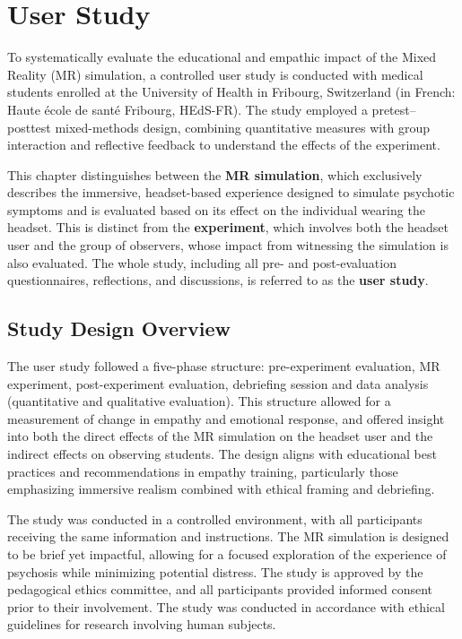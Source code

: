 \chapter{User Study}
\label{ch:userstudy}


To systematically evaluate the educational and empathic impact of the Mixed Reality (MR) simulation, a controlled user study is conducted with medical students enrolled at the University of Health in Fribourg, Switzerland (in French: Haute école de santé Fribourg, HEdS-FR). The study employed a pretest–posttest mixed-methods design, combining quantitative measures with group interaction and reflective feedback to understand the effects of the experiment.

\vspace{1em}

This chapter distinguishes between the \textbf{MR simulation}, which exclusively describes the immersive, headset-based experience designed to simulate psychotic symptoms and is evaluated based on its effect on the individual wearing the headset. This is distinct from the \textbf{experiment}, which involves both the headset user  and the group of observers, whose impact from witnessing the simulation is also evaluated. The whole study, including all pre- and post-evaluation questionnaires, reflections, and discussions, is referred to as the \textbf{user study}.

\section{Study Design Overview}

The user study followed a five-phase structure: pre-experiment evaluation, MR experiment, post-experiment evaluation, debriefing session and data analysis (quantitative and qualitative evaluation). This structure allowed for a measurement of change in empathy and emotional response, and offered insight into both the direct effects of the MR simulation on the headset user and the indirect effects on observing students. The design aligns with educational best practices and recommendations in empathy training, particularly those emphasizing immersive realism combined with ethical framing and debriefing.


\vspace{1em}
The study was conducted in a controlled environment, with all participants receiving the same information and instructions. The MR simulation is designed to be brief yet impactful, allowing for a focused exploration of the experience of psychosis while minimizing potential distress.
The study is approved by the pedagogical ethics committee, and all participants provided informed consent prior to their involvement. The study was conducted in accordance with ethical guidelines for research involving human subjects.

